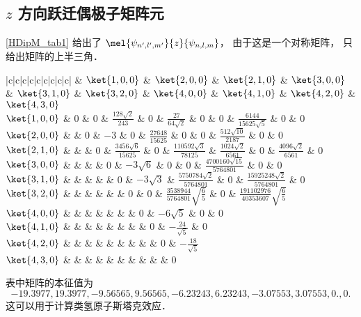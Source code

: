 

\subsection{$z$ 方向跃迁偶极子矩阵元}
\autoref{HDipM_tab1} 给出了 $\mel{\psi_{n',l',m'}}{z}{\psi_{n,l,m}}$， 由于这是一个对称矩阵， 只给出矩阵的上半三角．
\begin{table}[ht]
\centering
\caption{$\mel{\psi_{n',l',m'}}{z}{\psi_{n,l,m}}$}\label{HDipM_tab1}
\begin{tabular}{|c|c|c|c|c|c|c|c|c|}
\hline
& $\ket{1,0,0}$ & $\ket{2,0,0}$ & $\ket{2,1,0}$ & $\ket{3,0,0}$ & $\ket{3,1,0}$ & $\ket{3,2,0}$ & $\ket{4,0,0}$ &  $\ket{4,1,0}$ & $\ket{4,2,0}$ & $\ket{4,3,0}$ \\
\hline
$\ket{1,0,0}$ & 0 & 0 & $\frac{128\sqrt 2}{243}$ & 0 & $\frac{27}{64\sqrt 2}$ & 0 & 0 & $\frac{6144}{15625 \sqrt 5}$ & 0 & 0\\
\hline
$\ket{2,0,0}$ &  & 0 & $-3$ & 0 & $\frac{27648}{15625}$ & 0 & 0 & $\frac{512\sqrt{10}}{2187}$ & 0 & 0 \\
\hline
$\ket{2,1,0}$ &  &  & 0 & $\frac{3456\sqrt 6}{15625}$ & 0 & $\frac{110592\sqrt 3}{78125}$ & $\frac{1024\sqrt 2}{6561}$ & 0 & $\frac{4096\sqrt 2}{6561}$ & 0\\
\hline
$\ket{3,0,0}$ &  &  &  & 0 & $-3\sqrt 6$ & 0 & 0 & $\frac{4700160 \sqrt{15}}{5764801}$ & 0 & 0\\
\hline
$\ket{3,1,0}$ &  &  &  & & 0 & $-3 \sqrt 3$ & $\frac{5750784 \sqrt 2}{5764801}$ & 0 & $\frac{15925248 \sqrt 2}{5764801}$ & 0\\
\hline
$\ket{3,2,0}$ &  &  &  &  &  & 0 & 0 & $\frac{3538944}{5764801}\sqrt{\frac 65}$ & 0 & $\frac{191102976}{40353607}\sqrt{\frac 65}$ \\
\hline
$\ket{4,0,0}$ &  &  &  &  &  &  & 0 & $-6\sqrt 5$ & 0 & 0 \\
\hline
$\ket{4,1,0}$ &  &  &  &  &  &  &  & 0 & $-\frac{24}{\sqrt 5}$ & 0\\
\hline
$\ket{4,2,0}$ &  &  &  &  &  &  &  &  & 0 & $-\frac{18}{\sqrt 5}$ \\
\hline
$\ket{4,3,0}$ &  &  &  &  &  &  &  &  &  & 0\\
\hline
\end{tabular}
\end{table}

表中矩阵的本征值为
\begin{equation}
-19.3977, 19.3977, -9.56565, 9.56565, -6.23243, 6.23243, -3.07553, 3.07553, 0., 0.
\end{equation}
这可以用于计算类氢原子斯塔克效应．

